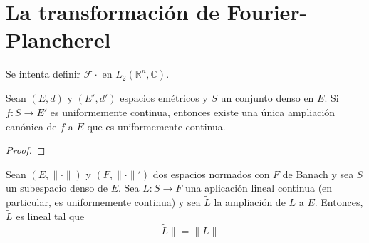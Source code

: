 \documentclass[12pt]{report}
\theoremstyle{largebreak}
\newcommand\cf[3]{\ensuremath{#1:#2\rightarrow#3}}
\newcommand\norm[1]{\ensuremath{\|#1\|}}
\newcommand{\fou}[1]{\ensuremath{\mathcal{F}#1}}
\begin{document}
    \section{La transformación de Fourier-Plancherel}

    Se intenta definir $\fou{\cdot}$ en $L_2(\mathbb{R}^n,\mathbb{C})$.

    \begin{theor}
        Sean $(E,d)$ y $(E',d')$ espacios emétricos y $S$ un conjunto denso en $E$. Si $\cf{f}{S}{E'}$ es uniformemente continua, entonces existe una única ampliación canónica de $f$ a $E$ que es uniformemente continua.
    \end{theor}

    \begin{proof}
        
    \end{proof}

    \begin{propo}
        Sean $(E,\norm{\cdot})$ y $(F,\norm{\cdot}')$ dos espacios normados con $F$ de Banach y sea $S$ un subespacio denso de $E$. Sea $\cf{L}{S}{F}$ una aplicación lineal continua (en particular, es uniformemente continua) y sea $\tilde{L}$ la ampliación de $L$ a $E$. Entonces, $\tilde{L}$ es lineal tal que
        \begin{equation*}
            \norm{\tilde{L}}=\norm{L}
        \end{equation*}
    \end{propo}
\end{document}
